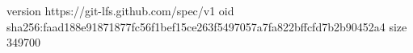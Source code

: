 version https://git-lfs.github.com/spec/v1
oid sha256:faad188e91871877fc56f1bef15ce263f5497057a7fa822bffcfd7b2b90452a4
size 349700
